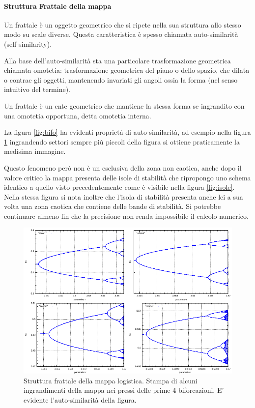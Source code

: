 \documentclass[13pt]{article}
\begin{document}
\paragraph{Struttura Frattale della mappa}

Un frattale è un oggetto geometrico che si ripete nella sua struttura allo stesso modo su scale diverse. Questa caratteristica è spesso chiamata auto-similarità (self-similarity).

Alla base dell’auto-similarità sta una particolare trasformazione geometrica chiamata omotetia: trasformazione geometrica del piano o dello spazio, che dilata o contrae gli oggetti, mantenendo invariati gli angoli ossia la forma (nel senso intuitivo del termine).

Un frattale è un ente geometrico che mantiene la stessa forma se ingrandito con una omotetia opportuna, detta omotetia interna.

La figura \ref{fig:bifo} ha evidenti proprietà di auto-similarità, ad esempio nella figura \ref{fig:frattali}  ingrandendo settori sempre più piccoli della figura si ottiene praticamente la medisima immagine.

Questo fenomeno però non è un esclusiva della zona non caotica, anche dopo il valore critico la mappa presenta delle isole di stabilità che ripropongo uno schema identico a quello visto precedentemente come è visibile nella figura \ref{fig:isole}. Nella stessa figura si nota inoltre che l'isola di stabilità presenta anche lei a sua volta una zona caotica che contiene  delle bande di stabilità. Si potrebbe continuare almeno fin che la precisione non renda impossibile il calcolo numerico.
%
\begin{figure}
\includegraphics[width=22cm,keepaspectratio]{quadro_1}
\caption{Struttura frattale della mappa logistica. Stampa di alcuni ingrandimenti della mappa nei pressi delle  prime 4 biforcazioni. E' evidente l'auto-similarità della figura.}
\label{fig:frattali}
\end{figure}
\end{document}

